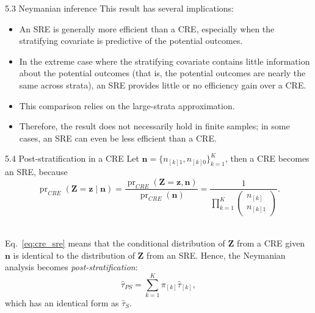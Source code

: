 \documentclass[aspectratio=169, 12pt]{beamer}
\begin{document}
\begin{frame}{5.3 Neymanian inference}
    This result has several implications:

  \begin{itemize}
    \item An SRE is generally more efficient than a CRE, especially when the stratifying covariate is predictive of the potential outcomes.
    \item In the extreme case where the stratifying covariate contains little information about the potential outcomes (that is, the potential outcomes are nearly the same across strata), an SRE provides little or no efficiency gain over a CRE.
    \item This comparison relies on the large-strata approximation.
    \item Therefore, the result does not necessarily hold in finite samples; in some cases, an SRE can even be less efficient than a CRE.
  \end{itemize}
\end{frame}

\begin{frame}[label=cre_sre]{5.4 Post-stratification in a CRE}
    Let $\bm{n}=\{n_{[k]1},n_{[k]0}\}_{k=1}^K$, then a CRE becomes an SRE, because 
    \begin{equation}
      \operatorname{pr}_{CRE}(\bm{Z}=\bm{z}\mid \bm{n}) = \frac{\operatorname{pr}_{CRE}(\bm{Z}=\bm{z},\bm{n})}{\operatorname{pr}_{CRE}(\bm{n})} = \frac{1}{\prod_{k=1}^{K}\begin{pmatrix}
      n_{[k]}\\n_{[k]1}
    \end{pmatrix}}.
    \label{eq:cre_sre}
    \end{equation}
    
    \vfill
    \hfill\hyperlink{pf-cre_sre<1>}{}\\

    Eq.~\eqref{eq:cre_sre} means that the conditional distribution of $\bm{Z}$ from a CRE given $\bm{n}$ is identical to the distribution of $\bm{Z}$ from an SRE. Hence, the Neymanian analysis becomes \textit{post-stratification}:
    \[
    \widehat{\tau}_{PS}= \sum_{k=1}^{K}\pi_{[k]}\widehat{\tau}_{[k]},
    \]
    which has an identical form as $\widehat{\tau}_{S}$.
\end{frame}
\end{document}
